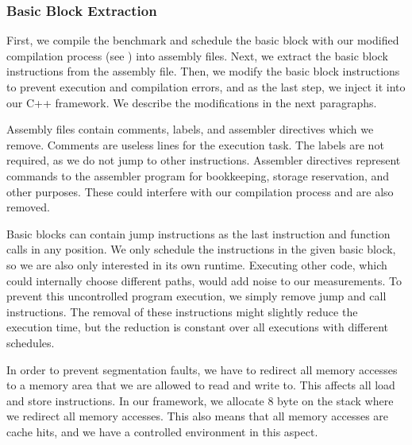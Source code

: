 \subsubsection{Basic Block Extraction}
First, we compile the benchmark and schedule the basic block with our modified compilation process (see ) into assembly files.
Next, we extract the basic block instructions from the assembly file.
Then, we modify the basic block instructions to prevent execution and compilation errors, and as the last step, we inject it into our C++ framework.
We describe the modifications in the next paragraphs.

Assembly files contain comments, labels, and assembler directives which we remove.
Comments are useless lines for the execution task. 
The labels are not required, as we do not jump to other instructions.
Assembler directives represent commands to the assembler program for bookkeeping, storage reservation, and other purposes.
These could interfere with our compilation process and are also removed.

Basic blocks can contain jump instructions as the last instruction and function calls in any position.
We only schedule the instructions in the given basic block, so we are also only interested in its own runtime.
Executing other code, which could internally choose different paths, would add noise to our measurements.
To prevent this uncontrolled program execution, we simply remove jump and call instructions.
The removal of these instructions might slightly reduce the execution time, but the reduction is constant over all executions with different schedules.

In order to prevent segmentation faults, we have to redirect all memory accesses to a memory area that we are allowed to read and write to.
This affects all load and store instructions.
In our framework, we allocate 8 byte on the stack where we redirect all memory accesses.
This also means that all memory accesses are cache hits, and we have a controlled environment in this aspect.

